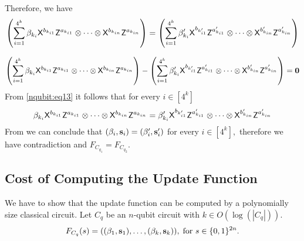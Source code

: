 Therefore, we have 
\begin{equation}
\label{nqubit:eq12}
\begin{aligned}
\left(\sum_{i=1}^{4^k} \beta_{k_i} {\sf X}^{b_{k_{i1}}} {\sf Z}^{a_{k_{i1}}} \otimes \cdots  \otimes {\sf X}^{b_{k_{in}}} {\sf Z}^{a_{k_{in}}}\right)=\left(\sum_{i=1}^{4^k} \beta_{k_i}^\prime {\sf X}^{b_{k_{i1}^\prime}} {\sf Z}^{a_{k_{i1}}^\prime} \otimes \cdots  \otimes {\sf X}^{b_{k_{in}}^\prime} {\sf Z}^{a_{k_{in}}^\prime}\right)
\end{aligned}
\end{equation}

\begin{equation}
\label{nqubit:eq13}
\begin{aligned}
\left(\sum_{i=1}^{4^k} \beta_{k_i} {\sf X}^{b_{k_{i1}}} {\sf Z}^{a_{k_{i1}}} \otimes \cdots  \otimes {\sf X}^{b_{k_{in}}} {\sf Z}^{a_{k_{in}}}\right)-\left(\sum_{i=1}^{4^k} \beta_{k_i}^\prime {\sf X}^{b_{k_{i1}^\prime}} {\sf Z}^{a_{k_{i1}}^\prime} \otimes \cdots  \otimes {\sf X}^{b_{k_{in}}^\prime} {\sf Z}^{a_{k_{in}}^\prime}\right)={\bf 0}
\end{aligned}
\end{equation}
From \cref{nqubit:eq13} it follows that for every $i\in [4^k]$
\begin{equation}
\label{nqubit:eq14}
\beta_{k_i} {\sf X}^{b_{k_{i1}}} {\sf Z}^{a_{k_{i1}}} \otimes \cdots  \otimes {\sf X}^{b_{k_{in}}} {\sf Z}^{a_{k_{in}}}=\beta_{k_i}^\prime {\sf X}^{b_{k_{i1}^\prime}} {\sf Z}^{a_{k_{i1}}^\prime} \otimes \cdots  \otimes {\sf X}^{b_{k_{in}}^\prime} {\sf Z}^{a_{k_{in}}^\prime}
\end{equation}
From  we can conclude that $(\beta_i, {\bf s}_i)=(\beta_i^\prime, {\bf s}_i^\prime)$ for every $i\in [4^k],$ therefore we have contradiction and $F_{C_{q_1}}=F_{C_{q_2}}.$


\subsection{Cost of Computing the Update Function}
We have to show that the update function can be computed by a polynomially size classical circuit. Let $C_q $ be an $n$-qubit circuit  with $k\in O(\log(|C_q|)).$
\begin{equation*}
F_{C_q}(s)=((\beta_1, {\bf s}_1),\ldots, (\beta_k, {\bf s}_k)),\; \mbox{for } s\in\{0,1\}^{2n}.
 \end{equation*}  
 
